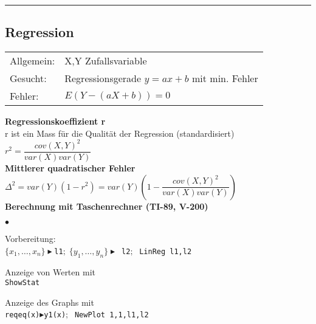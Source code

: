 \hrule

\vspace{2mm}
	\begin{minipage}[]{9cm}
	\subsection{Regression  }
		\begin{tabular}{ll}
        Allgemein: & X,Y Zufallsvariable\\
        Gesucht: & Regressionsgerade $y=ax+b$ mit min. Fehler\\
        Fehler: & $E(Y-(aX+b))=0$
        \end{tabular}
		\vspace{.1cm}

		\textbf{Regressionskoeffizient r}\\
        r ist ein Mass für die Qualität der Regression (standardisiert)\\
        $r^2=\dfrac{cov(X,Y)^2}{var(X)var(Y)}$ \\
        
		\textbf{Mittlerer quadratischer Fehler}\\
        $ \Delta^2 = var(Y)(1-r^2) =
        var(Y)\left(1-\dfrac{cov(X,Y)^2}{var(X)var(Y)}\right) $ \\
        
        \textbf{Berechnung mit Taschenrechner (TI-89, V-200)}
        \begin{list}{$\bullet$}{\setlength{\itemsep}{0cm}
        \setlength{\parsep}{0cm} \setlength{\topsep}{0cm}}  
	        \item Vorbereitung:\\
	        \texttt{$\{x_1, \ldots, x_n\} \blacktriangleright$\texttt{l1}$; \; 
	        \{y_1, \ldots,y_n\}\blacktriangleright$ \texttt{l2}$; \;$} \texttt{LinReg l1,l2}
	        \item Anzeige von Werten mit \\ \texttt{ShowStat}
	        \item Anzeige des Graphs mit \\
	        \texttt{reqeq(x)}$\blacktriangleright$\texttt{y1(x)}$; \;$
	        \texttt{NewPlot 1,1,l1,l2}
        \end{list}
	\end{minipage}
